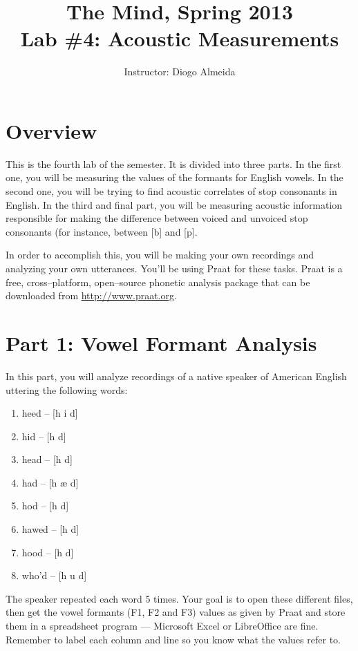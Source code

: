 \documentclass{article}
\title{The Mind, Spring 2013\\ Lab \#4: Acoustic Measurements}
\author{Instructor: Diogo Almeida}
\newcommand{\soft}[1]{\textsf{#1}}
\newcommand{\MSExcel}{\soft{Microsoft\texttrademark{} Excel}}
\newcommand{\OpOff}{\soft{LibreOffice}}
\newcommand{\Praat}{\soft{Praat}}
\begin{document}
\maketitle

\tableofcontents
\newpage
\listoffigures
\newpage
\section{Overview}

This is the fourth lab of the semester. It is divided into three parts. In the first one, you will be measuring the values of the formants for English vowels. In the second one, you will be trying to find acoustic correlates of stop consonants in English. In the third and final part, you will be measuring acoustic information responsible for making the difference between voiced and unvoiced stop consonants (for instance, between [b] and [p].

In order to accomplish this, you will be making your own recordings and analyzing your own utterances. You'll be using \Praat{} for these tasks. \Praat{} is a free, cross--platform, open--source phonetic analysis package that can be downloaded from \href{http://www.praat.org}{http://www.praat.org}.

\section{Part 1: Vowel Formant Analysis}

In this part, you will analyze recordings of a native speaker of American English uttering the following words:

\begin{enumerate}
\item heed -- [h i\textlengthmark{} d]
\item hid -- [h \textsci{} d]
\item head -- [h \textepsilon{} d] 
\item had -- [h \ae {} d]
\item hod -- [h \textscripta\textlengthmark{} d]
\item hawed -- [h \textopeno\textlengthmark{} d]
\item hood -- [h \textupsilon{} d]
\item who'd -- [h u\textlengthmark{} d]
\end{enumerate}

The speaker repeated each word 5 times. Your goal is to open these different files, then get the vowel formants (F1, F2 and F3) values as given by \Praat{} and store them in a spreadsheet program --- \MSExcel{} or \OpOff{} are fine. Remember to label each column and line so you know what the values refer to.
\end{document}
